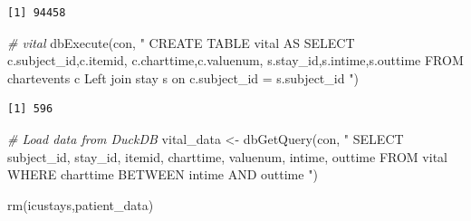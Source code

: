 \documentclass[
]{article}
\newenvironment{Shaded}{\begin{snugshade}}{\end{snugshade}}
\newcommand{\CommentTok}[1]{\textcolor[rgb]{0.56,0.35,0.01}{\textit{#1}}}
\newcommand{\FunctionTok}[1]{\textcolor[rgb]{0.00,0.00,0.00}{#1}}
\newcommand{\NormalTok}[1]{\textcolor[rgb]{0.00,0.00,0.00}{#1}}
\newcommand{\OtherTok}[1]{\textcolor[rgb]{0.56,0.35,0.01}{#1}}
\newcommand{\StringTok}[1]{\textcolor[rgb]{0.31,0.60,0.02}{#1}}
\begin{document}
\begin{verbatim}
[1] 94458
\end{verbatim}

\begin{Shaded}
\begin{Highlighting}[]
\CommentTok{\# vital}
\FunctionTok{dbExecute}\NormalTok{(con, }\StringTok{"}
\StringTok{  CREATE TABLE vital AS}
\StringTok{  SELECT c.subject\_id,c.itemid,}
\StringTok{  c.charttime,c.valuenum,}
\StringTok{  s.stay\_id,s.intime,s.outtime}
\StringTok{  FROM chartevents c}
\StringTok{  Left join stay s}
\StringTok{  on c.subject\_id = s.subject\_id}
\StringTok{"}\NormalTok{)}
\end{Highlighting}
\end{Shaded}

\begin{verbatim}
[1] 596
\end{verbatim}

\begin{Shaded}
\begin{Highlighting}[]
\CommentTok{\# Load data from DuckDB}
\NormalTok{vital\_data }\OtherTok{\textless{}{-}} \FunctionTok{dbGetQuery}\NormalTok{(con, }\StringTok{"}
\StringTok{  SELECT subject\_id, stay\_id, itemid, charttime,}
\StringTok{  valuenum, intime, outtime}
\StringTok{  FROM vital  }
\StringTok{  WHERE charttime BETWEEN intime AND outtime}
\StringTok{"}\NormalTok{)}

\FunctionTok{rm}\NormalTok{(icustays,patient\_data)}
\end{Highlighting}
\end{Shaded}
\end{document}

